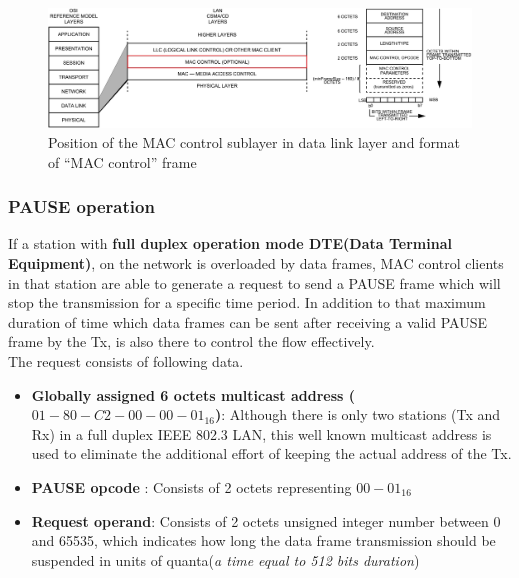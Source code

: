 \documentclass[a4paper,11pt]{article}%
\begin{document}
  	\begin{figure}[!h]
  	\centering
  	\includegraphics[scale=0.75]{figures/macc}
  	\caption{Position of the MAC control sublayer in data link layer and format of ``MAC control'' frame  \cite{main}}
  \end{figure}

\subsubsection{PAUSE operation}
If a station with \textbf{full duplex operation mode DTE(Data Terminal Equipment)}, on the network is overloaded by data frames, MAC control clients in that station are able to generate a request\cite{main} to send a PAUSE frame which will stop the transmission for a specific time period. In addition to that maximum duration of time which data frames can be sent after receiving a valid PAUSE frame by the Tx, is also there to control the flow effectively.\\

The request consists of following data.

\begin{itemize}

	\item \textbf{Globally assigned 6 octets multicast address (${01-80-C2-00-00-01}_{16}$)}: Although there is only two stations (Tx and Rx) in a full duplex IEEE 802.3 LAN, this well known multicast address is used to eliminate the additional effort of keeping the actual address of the Tx.
	  
	\item \textbf{PAUSE opcode} : Consists of 2 octets representing ${00-01}_{16}$
	
	\item \textbf{Request operand}: Consists of 2 octets unsigned integer number between 0 and 65535, which indicates how long the data frame transmission should be suspended in units of quanta(\textit{a time equal to 512 bits duration})
	
\end{itemize}
\end{document}
